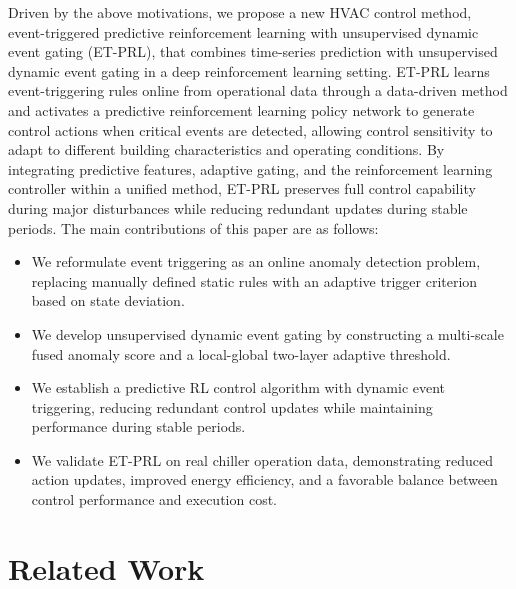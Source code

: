 ﻿\documentclass[preprint,12pt,number]{elsarticle}
\begin{document}
Driven by the above motivations, we propose a new HVAC control method, event-triggered predictive reinforcement learning with unsupervised dynamic event gating (ET-PRL), that combines time-series prediction with unsupervised dynamic event gating in a deep reinforcement learning setting. ET-PRL learns event-triggering rules online from operational data through a data-driven method and activates a predictive reinforcement learning policy network to generate control actions when critical events are detected, allowing control sensitivity to adapt to different building characteristics and operating conditions. By integrating predictive features, adaptive gating, and the reinforcement learning controller within a unified method, ET-PRL preserves full control capability during major disturbances while reducing redundant updates during stable periods. The main contributions of this paper are as follows:

\begin{itemize}
\item
  We reformulate event triggering as an online anomaly detection problem, replacing manually defined static rules with an adaptive trigger criterion based on state deviation.
\item
  We develop unsupervised dynamic event gating by constructing a multi-scale fused anomaly score and a local-global two-layer adaptive threshold.
\item
  We establish a predictive RL control algorithm with dynamic event triggering, reducing redundant control updates while maintaining performance during stable periods.
\item
  We validate ET-PRL on real chiller operation data, demonstrating reduced action updates, improved energy efficiency, and a favorable balance between control performance and execution cost.
\end{itemize}

\section{Related Work}\label{related-work}
\end{document}
